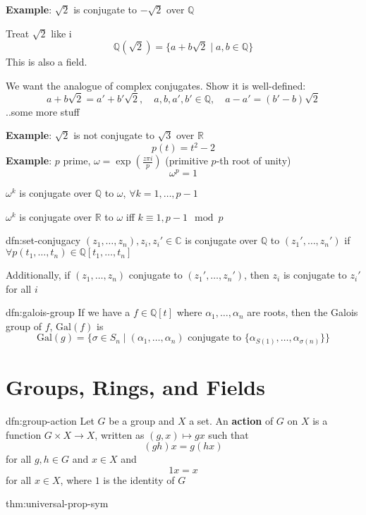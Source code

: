 \documentclass{article}
\begin{document}
\textbf{Example}: $\sqrt{2}$ is conjugate to $-\sqrt{2}$ over $\mathbb{Q}$

Treat $\sqrt{2}$ like i
\[\mathbb{Q}(\sqrt{2}) = \{a + b\sqrt{2} \mid a,b\in \mathbb{Q}\}\]
This is also a field.

We want the analogue of complex conjugates. Show it is well-defined:
\[a + b \sqrt{2} = a' + b' \sqrt{2}, \quad a,b,a',b'\in \mathbb{Q}, \quad a - a' = (b ' - b) \sqrt{2}\]
..some more stuff

\textbf{Example}: $\sqrt{2}$ is not conjugate to $\sqrt{3}$ over $\mathbb{R}$
\[p(t) = t^{2} - 2\]
\textbf{Example}: $p$ prime, $\omega = \exp\left( \frac{z\pi i}{p} \right)$ (primitive $p$-th root of unity)
\[\omega^{p} = 1\]

$\omega^{k}$ is conjugate over $\mathbb{Q}$ to $\omega$, $\forall k = 1,\dots,p-1$

$\omega^{k}$ is conjugate over $\mathbb{R}$ to $\omega$ iff $k \equiv 1, p - 1 \mod p$

\begin{dfn}{dfn:set-conjugacy}{}
    $(z_{1},\dots,z_{n}), z_{i}, z_{i}' \in \mathbb{C}$
    is conjugate over $\mathbb{Q}$ to $(z_{1}',\dots,z_{n}')$
    if $\forall p(t_{1},\dots,t_{n})\in \mathbb{Q}[t_{1},\dots,t_{n}]$

    \longrule{0.08ex}

    Additionally, if $(z_{1},\dots,z_{n})$ conjugate to $(z_{1}',\dots,z_{n}')$, then $z_{i}$ is conjugate to $z_{i}'$ for all $i$
\end{dfn}

\begin{dfn}{dfn:galois-group}{}
    If we have a $f\in \mathbb{Q}[t]$ where $\alpha_{1},\dots,\alpha_{n}$ are roots, then the Galois group of $f$, $\mathrm{Gal}(f)$ is
    \[\mathrm{Gal}(g) = \{\sigma \in S_{n} \mid (\alpha_{1},\dots,\alpha_{n}) \text{ conjugate to } \{\alpha_{S(1)},\dots,\alpha_{\sigma(n)}\}\}\]
\end{dfn}


\section{Groups, Rings, and Fields}

\begin{dfn}{dfn:group-action}{}
    Let $G$ be a group and $X$ a set. An \textbf{action} of $G$ on $X$ is a function $G \times X \to X$, written as $(g,x)\mapsto gx$ such that
    \[(gh)x = g(hx)\]
    for all $g, h\in G$ and $x\in X$ and
    \[1x = x\]
    for all $x\in X$, where $1$ is the identity of $G$
\end{dfn}

\begin{thm}{thm:universal-prop-sym}{}
    
\end{thm}
\end{document}
